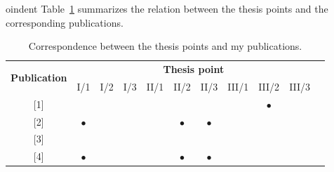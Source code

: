 \documentclass[12pt,a4paper]{extarticle}
\begin{document}
\vspace*{1em}

oindent
Table~\ref{tab:summary_table} summarizes the relation between the thesis points and the corresponding publications.
\vspace*{2em}

\begin{table}[h!]
\centering
\caption{Correspondence between the thesis points and my publications.}
\label{tab:summary_table}
\begin{tabular}{|c|c|c|c|c|c|c|c|c|c|c|}
\hline
\multirow{2}{*}{\textbf{Publication}} & \multicolumn{9}{c|}{\textbf{Thesis point}}                                                                                                                                                                                                                                        \\
                                      & \multicolumn{1}{c|}{I/1}       & \multicolumn{1}{c|}{I/2}       & \multicolumn{1}{c|}{I/3}       & \multicolumn{1}{c|}{II/1}      & \multicolumn{1}{c|}{II/2}      & \multicolumn{1}{c|}{II/3}      & \multicolumn{1}{c|}{III/1}     & \multicolumn{1}{c|}{III/2}     & III/3     \\ \hline
{[}1{]}                               & \multicolumn{1}{c|}{}          & \multicolumn{1}{c|}{}          & \multicolumn{1}{c|}{}          & \multicolumn{1}{c|}{}          & \multicolumn{1}{c|}{}          & \multicolumn{1}{c|}{}          & \multicolumn{1}{c|}{}          & \multicolumn{1}{c|}{$\bullet$} &           \\ \hline
{[}2{]}                               & \multicolumn{1}{c|}{$\bullet$} & \multicolumn{1}{c|}{}          & \multicolumn{1}{c|}{}          & \multicolumn{1}{c|}{}          & \multicolumn{1}{c|}{$\bullet$} & \multicolumn{1}{c|}{$\bullet$} & \multicolumn{1}{c|}{}          & \multicolumn{1}{c|}{}          &           \\ \hline
{[}3{]}                               & \multicolumn{1}{c|}{}          & \multicolumn{1}{c|}{}          & \multicolumn{1}{c|}{}          & \multicolumn{1}{c|}{}          & \multicolumn{1}{c|}{}          & \multicolumn{1}{c|}{}          & \multicolumn{1}{c|}{}          & \multicolumn{1}{c|}{}          &           \\ \hline
{[}4{]}                               & \multicolumn{1}{c|}{$\bullet$} & \multicolumn{1}{c|}{}          & \multicolumn{1}{c|}{}          & \multicolumn{1}{c|}{}          & \multicolumn{1}{c|}{$\bullet$} & \multicolumn{1}{c|}{$\bullet$} & \multicolumn{1}{c|}{}          & \multicolumn{1}{c|}{}          &           \\ \hline

\end{tabular}
\end{table}
\end{document}
